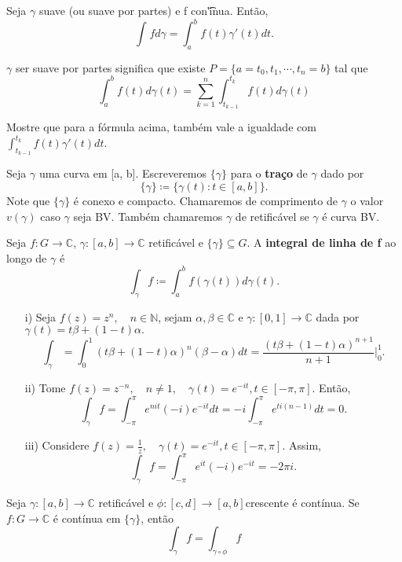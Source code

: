 \documentclass[ComplexAnalysis/complex.tex]{subfiles}
\begin{document}
\begin{theorem*}
	Seja $\gamma$ suave (ou suave por partes) e f con\t'inua. Então,
	$$
		\int_{}^{}f d \gamma = \int_{a}^{b}f(t)\gamma'(t)dt.
	$$
\end{theorem*}
$\gamma$ ser suave por partes significa que existe $P =\{a=t_{0}, t_1, \cdots, t_{n} = b\} $ tal que
$$
	\int_{a}^{b}f(t)d\gamma(t) = \sum\limits_{k=1}^{n}\int_{t_{k-1}}^{t_{k}}f(t)d\gamma(t)
$$
\begin{exer*}
	Mostre que para a fórmula acima, também vale a igualdade com $\int_{t_{k-1}}^{t_{k}}f(t)\gamma'(t)dt.$
\end{exer*}
\begin{def*}
	Seja $\gamma$ uma curva em [a, b]. Escreveremos $\{\gamma\} $ para o \textbf{traço} de $\gamma$ dado por
	$$
		\{\gamma\}\coloneqq  \{\gamma(t): t\in{[a, b]}\}.
	$$
	Note que $\{\gamma\} $ é conexo e compacto. Chamaremos de comprimento de $\gamma$ o valor $v(\gamma)$ caso $\gamma$ seja BV.
	Também chamaremos $\gamma$ de retificável se $\gamma$ é curva BV.
\end{def*}
\begin{def*}
	Seja $f:G\rightarrow \mathbb{C}$, $\gamma:[a, b]\rightarrow \mathbb{C}$ retificável e $\{\gamma\}\subseteq{G}.$ A \textbf{integral de
		linha de f} ao longo de $\gamma$ é
	$$
		\int_{\gamma}^{}f \coloneqq  \int_{a}^{b}f(\gamma(t))d\gamma(t).
	$$
\end{def*}
\begin{example}
	\begin{itemize}
		\item[i)] Seja $f(z) = z^n, \quad n\in{\mathbb{N}}$, sejam $\alpha, \beta\in \mathbb{C}$ e $\gamma:[0, 1]\rightarrow \mathbb{C}$
		      dada por $\gamma(t) = t \beta + (1-t)\alpha.$
		      $$
			      \int_{\gamma}^{}=\int_{0}^{1}(t\beta + (1-t)\alpha)^n(\beta - \alpha)dt = \frac{(t\beta + (1-t)\alpha)^{n+1}}{n+1}\biggl|_0^1\biggr.
		      $$
		\item[ii)] Tome $f(z) = z^{-n}, \quad n\neq1, \quad \gamma(t) = e^{-it}, t\in[-\pi, \pi].$ Então,
		      $$
			      \int_{\gamma}^{}f = \int_{-\pi}^{\pi}e^{nit}(-i)e^{-it}dt = -i \int_{-\pi}^{\pi}e^{ti(n-1)}dt = 0.
		      $$
		\item[iii)] Considere $f(z) = \frac{1}{z}, \quad \gamma(t) = e^{-it}, t\in[-\pi, \pi].$ Assim,
		      $$
			      \int_{\gamma}^{}f = \int_{-\pi}^{\pi}e^{it}(-i)e^{-it} = -2\pi i.
		      $$
	\end{itemize}
\end{example}
\begin{prop*}
	Seja $\gamma:[a, b]\rightarrow \mathbb{C}$ retificável e $\phi:[c, d]\rightarrow [a, b]$crescente é contínua. Se $f:G\rightarrow \mathbb{C}$
	é contínua em $\{\gamma\} $, então
	$$
		\int_{\gamma}^{}f = \int_{\gamma\circ{\phi}}^{}f
	$$
\end{prop*}
\end{document}
